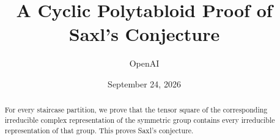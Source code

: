 \documentclass[11pt]{article}
\title{A Cyclic Polytabloid Proof of Saxl's Conjecture}
\author{OpenAI}
\date{September 24, 2026}
\numberwithin{equation}{section}
\theoremstyle{definition}
\theoremstyle{remark}
\begin{document}
\maketitle
\begin{abstract}
For every staircase partition, we prove that the tensor square of the
corresponding irreducible complex representation of the symmetric group
contains every irreducible representation of that group. This proves
Saxl's conjecture.
\end{abstract}







\end{document}
